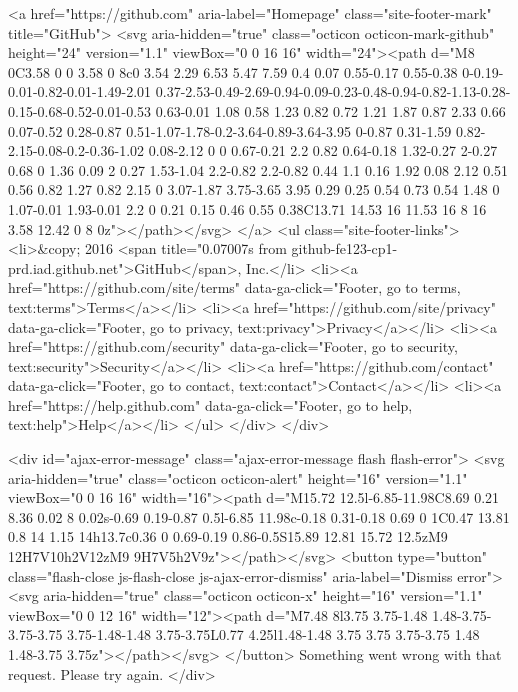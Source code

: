     <a href="https://github.com" aria-label="Homepage" class="site-footer-mark" title="GitHub">
      <svg aria-hidden="true" class="octicon octicon-mark-github" height="24" version="1.1" viewBox="0 0 16 16" width="24"><path d="M8 0C3.58 0 0 3.58 0 8c0 3.54 2.29 6.53 5.47 7.59 0.4 0.07 0.55-0.17 0.55-0.38 0-0.19-0.01-0.82-0.01-1.49-2.01 0.37-2.53-0.49-2.69-0.94-0.09-0.23-0.48-0.94-0.82-1.13-0.28-0.15-0.68-0.52-0.01-0.53 0.63-0.01 1.08 0.58 1.23 0.82 0.72 1.21 1.87 0.87 2.33 0.66 0.07-0.52 0.28-0.87 0.51-1.07-1.78-0.2-3.64-0.89-3.64-3.95 0-0.87 0.31-1.59 0.82-2.15-0.08-0.2-0.36-1.02 0.08-2.12 0 0 0.67-0.21 2.2 0.82 0.64-0.18 1.32-0.27 2-0.27 0.68 0 1.36 0.09 2 0.27 1.53-1.04 2.2-0.82 2.2-0.82 0.44 1.1 0.16 1.92 0.08 2.12 0.51 0.56 0.82 1.27 0.82 2.15 0 3.07-1.87 3.75-3.65 3.95 0.29 0.25 0.54 0.73 0.54 1.48 0 1.07-0.01 1.93-0.01 2.2 0 0.21 0.15 0.46 0.55 0.38C13.71 14.53 16 11.53 16 8 16 3.58 12.42 0 8 0z"></path></svg>
</a>
    <ul class="site-footer-links">
      <li>&copy; 2016 <span title="0.07007s from github-fe123-cp1-prd.iad.github.net">GitHub</span>, Inc.</li>
        <li><a href="https://github.com/site/terms" data-ga-click="Footer, go to terms, text:terms">Terms</a></li>
        <li><a href="https://github.com/site/privacy" data-ga-click="Footer, go to privacy, text:privacy">Privacy</a></li>
        <li><a href="https://github.com/security" data-ga-click="Footer, go to security, text:security">Security</a></li>
        <li><a href="https://github.com/contact" data-ga-click="Footer, go to contact, text:contact">Contact</a></li>
        <li><a href="https://help.github.com" data-ga-click="Footer, go to help, text:help">Help</a></li>
    </ul>
  </div>
</div>



    
    

    <div id="ajax-error-message" class="ajax-error-message flash flash-error">
      <svg aria-hidden="true" class="octicon octicon-alert" height="16" version="1.1" viewBox="0 0 16 16" width="16"><path d="M15.72 12.5l-6.85-11.98C8.69 0.21 8.36 0.02 8 0.02s-0.69 0.19-0.87 0.5l-6.85 11.98c-0.18 0.31-0.18 0.69 0 1C0.47 13.81 0.8 14 1.15 14h13.7c0.36 0 0.69-0.19 0.86-0.5S15.89 12.81 15.72 12.5zM9 12H7V10h2V12zM9 9H7V5h2V9z"></path></svg>
      <button type="button" class="flash-close js-flash-close js-ajax-error-dismiss" aria-label="Dismiss error">
        <svg aria-hidden="true" class="octicon octicon-x" height="16" version="1.1" viewBox="0 0 12 16" width="12"><path d="M7.48 8l3.75 3.75-1.48 1.48-3.75-3.75-3.75 3.75-1.48-1.48 3.75-3.75L0.77 4.25l1.48-1.48 3.75 3.75 3.75-3.75 1.48 1.48-3.75 3.75z"></path></svg>
      </button>
      Something went wrong with that request. Please try again.
    </div>


